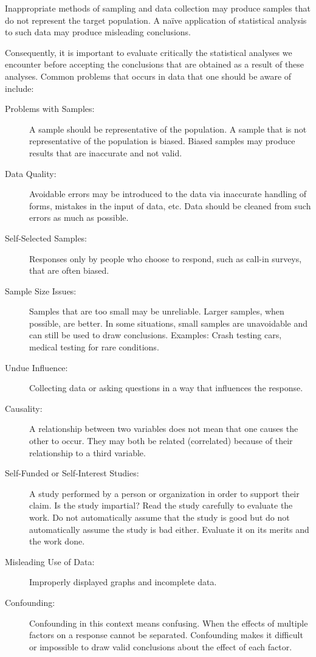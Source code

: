 \documentclass[]{krantz}
\theoremstyle{definition}
\theoremstyle{definition}
\theoremstyle{definition}
\theoremstyle{remark}
\begin{document}
Inappropriate methods of sampling and data collection may produce
samples that do not represent the target population. A naïve application
of statistical analysis to such data may produce misleading conclusions.

Consequently, it is important to evaluate critically the statistical
analyses we encounter before accepting the conclusions that are obtained
as a result of these analyses. Common problems that occurs in data that
one should be aware of include:

\begin{description}
\item[Problems with Samples:]
A sample should be representative of the population. A sample that
is not representative of the population is biased. Biased samples
may produce results that are inaccurate and not valid.
\item[Data Quality:]
Avoidable errors may be introduced to the data via inaccurate
handling of forms, mistakes in the input of data, etc. Data should
be cleaned from such errors as much as possible.
\item[Self-Selected Samples:]
Responses only by people who choose to respond, such as call-in
surveys, that are often biased.
\item[Sample Size Issues:]
Samples that are too small may be unreliable. Larger samples, when
possible, are better. In some situations, small samples are
unavoidable and can still be used to draw conclusions. Examples:
Crash testing cars, medical testing for rare conditions.
\item[Undue Influence:]
Collecting data or asking questions in a way that influences the
response.
\item[Causality:]
A relationship between two variables does not mean that one causes
the other to occur. They may both be related (correlated) because of
their relationship to a third variable.
\item[Self-Funded or Self-Interest Studies:]
A study performed by a person or organization in order to support
their claim. Is the study impartial? Read the study carefully to
evaluate the work. Do not automatically assume that the study is
good but do not automatically assume the study is bad either.
Evaluate it on its merits and the work done.
\item[Misleading Use of Data:]
Improperly displayed graphs and incomplete data.
\item[Confounding:]
Confounding in this context means confusing. When the effects of
multiple factors on a response cannot be separated. Confounding
makes it difficult or impossible to draw valid conclusions about the
effect of each factor.
\end{description}
\end{document}

